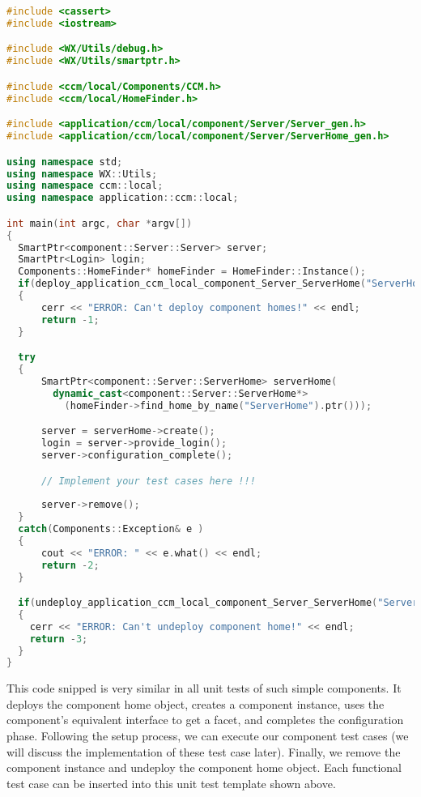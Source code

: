 \begin{footnotesize} 
\begin{lstlisting}[language=C++]
#include <cassert>
#include <iostream>

#include <WX/Utils/debug.h>
#include <WX/Utils/smartptr.h>

#include <ccm/local/Components/CCM.h>
#include <ccm/local/HomeFinder.h>

#include <application/ccm/local/component/Server/Server_gen.h>
#include <application/ccm/local/component/Server/ServerHome_gen.h>

using namespace std;
using namespace WX::Utils;
using namespace ccm::local;
using namespace application::ccm::local;

int main(int argc, char *argv[])
{
  SmartPtr<component::Server::Server> server;
  SmartPtr<Login> login;
  Components::HomeFinder* homeFinder = HomeFinder::Instance();
  if(deploy_application_ccm_local_component_Server_ServerHome("ServerHome")) 
  {
      cerr << "ERROR: Can't deploy component homes!" << endl;
      return -1;
  }

  try 
  {
      SmartPtr<component::Server::ServerHome> serverHome(
        dynamic_cast<component::Server::ServerHome*>
          (homeFinder->find_home_by_name("ServerHome").ptr()));

      server = serverHome->create();
      login = server->provide_login();
      server->configuration_complete();

      // Implement your test cases here !!!
    
      server->remove();
  } 
  catch(Components::Exception& e ) 
  {
      cout << "ERROR: " << e.what() << endl;
      return -2;
  } 

  if(undeploy_application_ccm_local_component_Server_ServerHome("ServerHome")) 
  {
    cerr << "ERROR: Can't undeploy component home!" << endl;
    return -3;
  }
}
\end{lstlisting}
\end{footnotesize}

This code snipped is very similar in all unit tests of such simple components.
It deploys the component home object, creates a component instance, uses 
the component's equivalent interface to get a facet, and completes the
configuration phase. 
Following the setup process, we can execute our component test cases (we will
discuss the implementation of these test case later).
Finally, we remove the component instance and undeploy the component home object.
Each functional test case can be inserted into this unit test template shown above.


